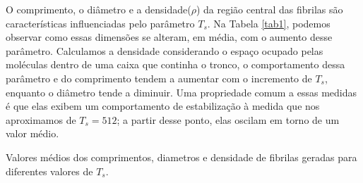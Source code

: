 \documentclass{article}
\begin{document}
    O comprimento, o diâmetro e a densidade(\(\rho\)) da região central das fibrilas são características influenciadas pelo 
    parâmetro \(T_{s}\). Na Tabela \ref{tab1}, podemos observar como essas dimensões se alteram, em média, com o 
    aumento desse parâmetro. Calculamos a densidade considerando o espaço ocupado pelas moléculas dentro de uma caixa
    que continha o tronco, o comportamento dessa parâmetro e do comprimento tendem a aumentar com o incremento de \(T_{s}\), enquanto 
    o diâmetro tende a diminuir. Uma propriedade comum a essas medidas é que elas exibem um comportamento de 
    estabilização à medida que nos aproximamos de \(T_{s} = 512\); a partir desse ponto, elas oscilam em torno de um 
    valor médio. 

    \begin{table}[H]
        \caption{Valores médios dos comprimentos, diametros e densidade de fibrilas geradas para diferentes valores de \(T_{s}\).}


\end{table}
\end{document}
